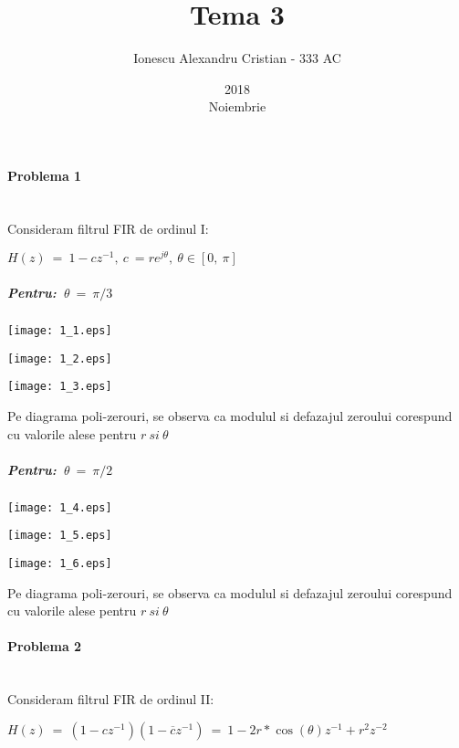 \documentclass[12pt,english]{article}
\title{Tema 3}
\date{2018\\ Noiembrie}
\author{Ionescu Alexandru Cristian - 333 AC}
\newcommand{\myparagraph}[1]{\paragraph{#1}\mbox{}\\}
\begin{document}
\maketitle

\pagebreak


\myparagraph {Problema 1}

Consideram filtrul FIR de ordinul I:
\begin{center}
$\displaystyle H( z) \ =\ 1-cz^{-1} ,\ c\ =re^{j\theta } ,\ \theta \in [ 0,\ \pi ]$
\end{center}

\subparagraph {Pentru:\ $\displaystyle \theta \ =\ \pi /3$}

\begin{center}
\texttt{[image: 1\_1.eps]}
\end{center}

\begin{center}
\texttt{[image: 1\_2.eps]}
\end{center}

\begin{center}
\texttt{[image: 1\_3.eps]}
\end{center}

Pe diagrama poli-zerouri, se observa ca modulul si defazajul zeroului corespund cu valorile alese pentru $r \ si \ \theta$

\subparagraph {Pentru:\ $\displaystyle \theta \ =\ \pi /2$}

\begin{center}
\texttt{[image: 1\_4.eps]}
\end{center}

\begin{center}
\texttt{[image: 1\_5.eps]}
\end{center}

\begin{center}
\texttt{[image: 1\_6.eps]}
\end{center}

Pe diagrama poli-zerouri, se observa ca modulul si defazajul zeroului corespund cu valorile alese pentru $r \ si \ \theta$

\pagebreak
\myparagraph {Problema 2}

Consideram filtrul FIR de ordinul II:

\begin{center}
$\displaystyle H( z) \ =\ \left( 1-cz^{-1}\right)\left( 1-\overline{c} z^{-1}\right) \ =\ 1-2r*\cos( \theta ) z^{-1} +r^{2} z^{-2}$
\end{center}
\end{document}
